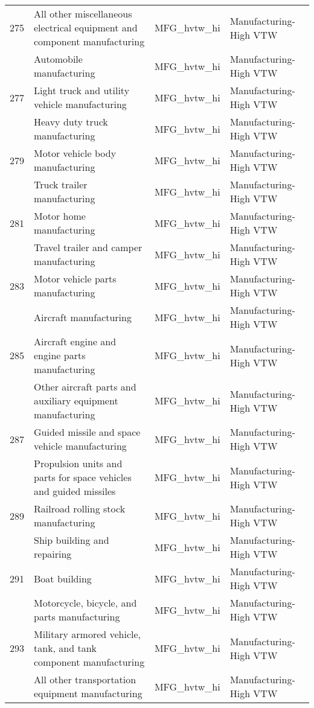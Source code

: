 \begin{landscape}
\begin{small}
\begin{longtable}{clll}
275 & All other miscellaneous electrical equipment and component manufacturing & MFG\_hvtw\_hi & Manufacturing-High VTW \\
\gray 276 & Automobile manufacturing & MFG\_hvtw\_hi & Manufacturing-High VTW \\
277 & Light truck and utility vehicle manufacturing & MFG\_hvtw\_hi & Manufacturing-High VTW \\
\gray 278 & Heavy duty truck manufacturing & MFG\_hvtw\_hi & Manufacturing-High VTW \\
279 & Motor vehicle body manufacturing & MFG\_hvtw\_hi & Manufacturing-High VTW \\
\gray 280 & Truck trailer manufacturing & MFG\_hvtw\_hi & Manufacturing-High VTW \\
281 & Motor home manufacturing & MFG\_hvtw\_hi & Manufacturing-High VTW \\
\gray 282 & Travel trailer and camper manufacturing & MFG\_hvtw\_hi & Manufacturing-High VTW \\
283 & Motor vehicle parts manufacturing & MFG\_hvtw\_hi & Manufacturing-High VTW \\
\gray 284 & Aircraft manufacturing & MFG\_hvtw\_hi & Manufacturing-High VTW \\
285 & Aircraft engine and engine parts manufacturing & MFG\_hvtw\_hi & Manufacturing-High VTW \\
\gray 286 & Other aircraft parts and auxiliary equipment manufacturing & MFG\_hvtw\_hi & Manufacturing-High VTW \\
287 & Guided missile and space vehicle manufacturing & MFG\_hvtw\_hi & Manufacturing-High VTW \\
\gray 288 & Propulsion units and parts for space vehicles and guided missiles & MFG\_hvtw\_hi & Manufacturing-High VTW \\
289 & Railroad rolling stock manufacturing & MFG\_hvtw\_hi & Manufacturing-High VTW \\
\gray 290 & Ship building and repairing & MFG\_hvtw\_hi & Manufacturing-High VTW \\
291 & Boat building & MFG\_hvtw\_hi & Manufacturing-High VTW \\
\gray 292 & Motorcycle, bicycle, and parts manufacturing & MFG\_hvtw\_hi & Manufacturing-High VTW \\
293 & Military armored vehicle, tank, and tank component manufacturing & MFG\_hvtw\_hi & Manufacturing-High VTW \\
\gray 294 & All other transportation equipment manufacturing & MFG\_hvtw\_hi & Manufacturing-High VTW \\

\end{longtable}
\end{small}
\end{landscape}
